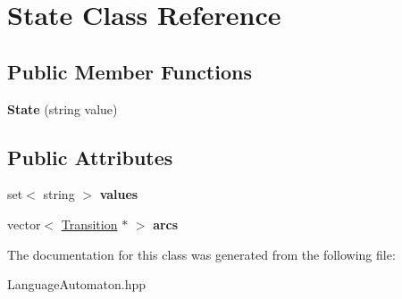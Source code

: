 \hypertarget{class_state}{\section{State Class Reference}
\label{class_state}
}
\subsection*{Public Member Functions}
\begin{DoxyCompactItemize}
\item 
\hypertarget{class_state_a5e18f782b78e7061fabdc7eac74c43bb}{{\bfseries State} (string value)}\label{class_state_a5e18f782b78e7061fabdc7eac74c43bb}

\end{DoxyCompactItemize}
\subsection*{Public Attributes}
\begin{DoxyCompactItemize}
\item 
\hypertarget{class_state_aafd2989152c64fa87b37fd3dd323b567}{set$<$ string $>$ {\bfseries values}}\label{class_state_aafd2989152c64fa87b37fd3dd323b567}

\item 
\hypertarget{class_state_a0cacb0728cd85eb6386fd3cb58fb2af9}{vector$<$ \hyperlink{class_transition}{Transition} $\ast$ $>$ {\bfseries arcs}}\label{class_state_a0cacb0728cd85eb6386fd3cb58fb2af9}

\end{DoxyCompactItemize}


The documentation for this class was generated from the following file\-:\begin{DoxyCompactItemize}
\item 
Language\-Automaton.\-hpp\end{DoxyCompactItemize}
